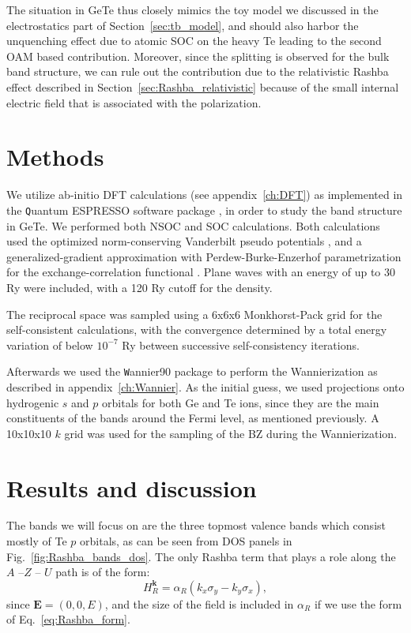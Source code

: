 The situation in GeTe thus closely mimics the toy model we discussed in the electrostatics part of Section~\ref{sec:tb_model}, and should also harbor the unquenching effect due to atomic \gls{SOC} on the heavy Te leading to the second \gls{OAM} based contribution.
Moreover, since the splitting is observed for the bulk band structure, we can rule out the contribution due to the relativistic Rashba effect described in Section~\ref{sec:Rashba_relativistic} because of the small internal electric field that is associated with the polarization.

\section{Methods}
We utilize ab-initio \gls{DFT} calculations (see appendix~\ref{ch:DFT}) as implemented in the {\texttt Quantum ESPRESSO} software package \cite{Giannozzi2009}, in order to study the band structure in GeTe.
We performed both \gls{NSOC} and \gls{SOC} calculations. 
Both calculations used the optimized norm-conserving Vanderbilt pseudo potentials \cite{Hamann2013}, and a generalized-gradient approximation \cite{Perdew1993} with Perdew-Burke-Enzerhof parametrization for the exchange-correlation functional \cite{Perdew1996}.
Plane waves with an energy of up to 30 Ry were included, with a 120 Ry cutoff for the density.

The reciprocal space was sampled using a 6x6x6 Monkhorst-Pack grid \cite{Pack1977} for the self-consistent calculations, with the convergence determined by a total energy variation of below $10^{-7}$ Ry between successive self-consistency iterations.

Afterwards we used the {\texttt Wannier90} package \cite{Mostofi2014AnFunctions} to perform the Wannierization as described in appendix~\ref{ch:Wannier}.
As the initial guess, we used projections onto hydrogenic $s$ and $p$ orbitals for both Ge and Te ions, since they are the main constituents of the bands around the Fermi level, as mentioned previously.
A 10x10x10 $k$ grid was used for the sampling of the \gls{BZ} during the Wannierization. 

\section{Results and discussion \label{sec:Rashba_results}}

The bands we will focus on are the three topmost valence bands which consist mostly of Te $p$ orbitals, as can be seen from \gls{DOS} panels in Fig.~\ref{fig:Rashba_bands_dos}.
The only Rashba term that plays a role along the $A$ --$Z$ -- $U$ path is of the form:
\begin{equation}
	H_R^{\bm k} = \alpha_R (k_x \sigma_y - k_y \sigma_x),
\end{equation}
since $\bm E = (0, 0, E)$, and the size of the field is included in $\alpha_R$ if we use the form of Eq.~\eqref{eq:Rashba_form}.
    
